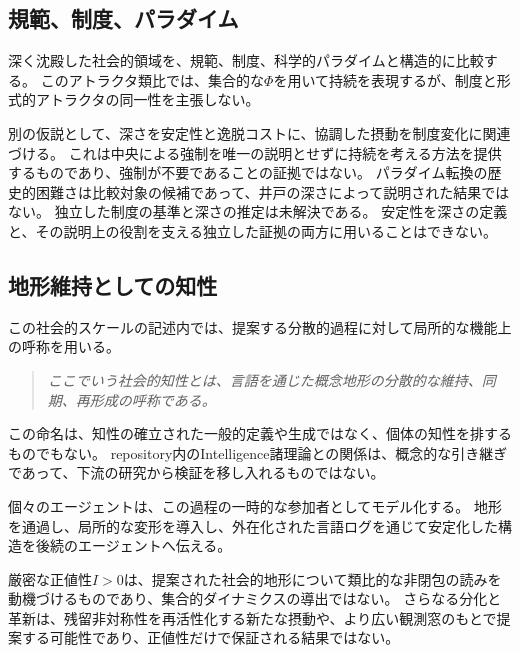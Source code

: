 \subsection{規範、制度、パラダイム}
深く沈殿した社会的領域を、規範、制度、科学的パラダイムと構造的に比較する。
このアトラクタ類比では、集合的な$\Phi$を用いて持続を表現するが、制度と形式的アトラクタの同一性を主張しない。

別の仮説として、深さを安定性と逸脱コストに、協調した摂動を制度変化に関連づける。
これは中央による強制を唯一の説明とせずに持続を考える方法を提供するものであり、強制が不要であることの証拠ではない。
パラダイム転換の歴史的困難さは比較対象の候補であって、井戸の深さによって説明された結果ではない。
独立した制度の基準と深さの推定は未解決である。
安定性を深さの定義と、その説明上の役割を支える独立した証拠の両方に用いることはできない。

\subsection{地形維持としての知性}
この社会的スケールの記述内では、提案する分散的過程に対して局所的な機能上の呼称を用いる。
\begin{quote}
\itshape
ここでいう社会的知性とは、言語を通じた概念地形の分散的な維持、同期、再形成の呼称である。
\end{quote}

この命名は、知性の確立された一般的定義や生成ではなく、個体の知性を排するものでもない。
repository内のIntelligence諸理論との関係は、概念的な引き継ぎであって、下流の研究から検証を移し入れるものではない。

個々のエージェントは、この過程の一時的な参加者としてモデル化する。
地形を通過し、局所的な変形を導入し、外在化された言語ログを通じて安定化した構造を後続のエージェントへ伝える。

厳密な正値性$I>0$は、提案された社会的地形について類比的な非閉包の読みを動機づけるものであり、集合的ダイナミクスの導出ではない。
さらなる分化と革新は、残留非対称性を再活性化する新たな摂動や、より広い観測窓のもとで提案する可能性であり、正値性だけで保証される結果ではない。
